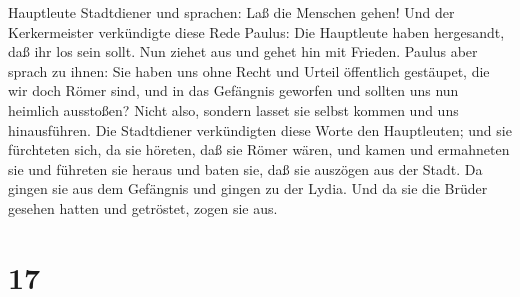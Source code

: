 Hauptleute Stadtdiener und sprachen: Laß die Menschen gehen!
 Und der Kerkermeister verkündigte diese Rede Paulus: Die
Hauptleute haben hergesandt, daß ihr los sein sollt. Nun ziehet aus und
gehet hin mit Frieden.  Paulus aber sprach zu ihnen: Sie
haben uns ohne Recht und Urteil öffentlich gestäupet, die wir doch Römer
sind, und in das Gefängnis geworfen und sollten uns nun heimlich
ausstoßen? Nicht also, sondern lasset sie selbst kommen und uns
hinausführen.  Die Stadtdiener verkündigten diese Worte den
Hauptleuten; und sie fürchteten sich, da sie höreten, daß sie Römer
wären,  und kamen und ermahneten sie und führeten sie
heraus und baten sie, daß sie auszögen aus der Stadt.  Da
gingen sie aus dem Gefängnis und gingen zu der Lydia. Und da sie die
Brüder gesehen hatten und getröstet, zogen sie aus.

\hypertarget{section-16}{%
\section{17}\label{section-16}}

